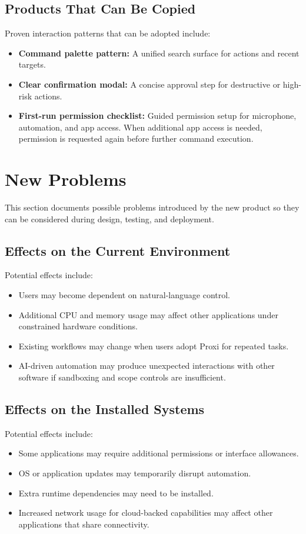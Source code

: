 \documentclass[12pt]{article}
\begin{document}
\subsection{Products That Can Be Copied}
Proven interaction patterns that can be adopted include:
\begin{itemize}
  \item \textbf{Command palette pattern:} A unified search surface for
  actions and recent targets.
  \item \textbf{Clear confirmation modal:} A concise approval step for
  destructive or high-risk actions.
  \item \textbf{First-run permission checklist:} Guided permission
  setup for microphone, automation, and app access. When additional app
  access is needed, permission is requested again before further
  command execution.
\end{itemize}

\section{New Problems}
This section documents possible problems introduced by the new product
so they can be considered during design, testing, and deployment.

\subsection{Effects on the Current Environment}
Potential effects include:
\begin{itemize}
  \item Users may become dependent on natural-language control.
  \item Additional CPU and memory usage may affect other applications
  under constrained hardware conditions.
  \item Existing workflows may change when users adopt Proxi for
  repeated tasks.
  \item AI-driven automation may produce unexpected interactions with
  other software if sandboxing and scope controls are insufficient.
\end{itemize}

\subsection{Effects on the Installed Systems}
Potential effects include:
\begin{itemize}
  \item Some applications may require additional permissions or
  interface allowances.
  \item OS or application updates may temporarily disrupt automation.
  \item Extra runtime dependencies may need to be installed.
  \item Increased network usage for cloud-backed capabilities may
  affect other applications that share connectivity.
\end{itemize}
\end{document}
